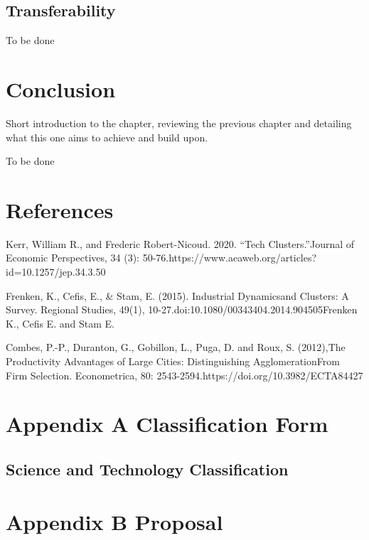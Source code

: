\documentclass[
  12pt,
  oneside]{book}
\begin{document}
\hypertarget{transferability}{%
\section{Transferability}\label{transferability}}

To be done

\hypertarget{conclusion}{%
\chapter{Conclusion}\label{conclusion}}

Short introduction to the chapter, reviewing the previous chapter and detailing what this one aims to achieve and build upon.

To be done

\hypertarget{references}{%
\chapter*{References}\label{references}}

Kerr, William R., and Frederic Robert-Nicoud. 2020. ``Tech Clusters.''Journal of Economic Perspectives, 34 (3): 50-76.https://www.aeaweb.org/articles?id=10.1257/jep.34.3.50

Frenken, K., Cefis, E., \& Stam, E. (2015). Industrial Dynamicsand Clusters: A Survey. Regional Studies, 49(1), 10-27.doi:10.1080/00343404.2014.904505Frenken K., Cefis E. and Stam E.

Combes, P.-P., Duranton, G., Gobillon, L., Puga, D. and Roux, S. (2012),The Productivity Advantages of Large Cities: Distinguishing AgglomerationFrom Firm Selection. Econometrica, 80: 2543-2594.https://doi.org/10.3982/ECTA84427

\printbibliography

\hypertarget{appendix-a-classification-form}{%
\chapter*{Appendix A Classification Form}\label{appendix-a-classification-form}}


\hypertarget{science-and-technology-classification}{%
\section*{Science and Technology Classification}\label{science-and-technology-classification}}

\hypertarget{appendix-b-proposal}{%
\chapter*{Appendix B Proposal}\label{appendix-b-proposal}}

\enddocument

\printbibliography
\end{document}
